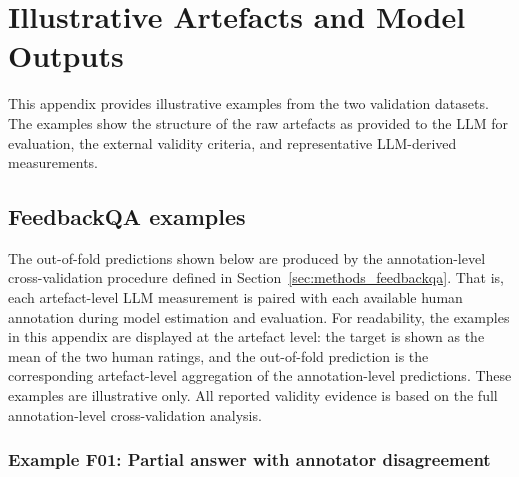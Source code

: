 \section{Illustrative Artefacts and Model Outputs}
\label{app:sample_artefacts_outputs}

This appendix provides illustrative examples from the two validation datasets. 
The examples show the structure of the raw artefacts as provided to the LLM for evaluation, the external validity criteria, and representative LLM-derived measurements. 

\subsection{FeedbackQA examples}


The out-of-fold predictions shown below are produced by the annotation-level
cross-validation procedure defined in Section~\ref{sec:methods_feedbackqa}.
That is, each artefact-level LLM measurement is paired with each available human
annotation during model estimation and evaluation. For readability, the examples
in this appendix are displayed at the artefact level: the target is shown as the
mean of the two human ratings, and the out-of-fold prediction is the corresponding
artefact-level aggregation of the annotation-level predictions. These examples
are illustrative only. All reported validity evidence is based on the full
annotation-level cross-validation analysis.

\subsubsection*{Example F01: Partial answer with annotator disagreement}


